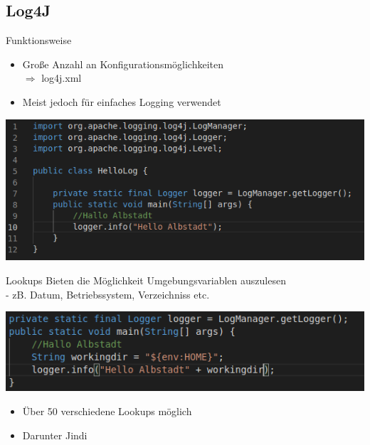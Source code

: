 \documentclass{beamer}
\begin{document}
\subsection{Log4J}
\begin{frame}{Funktionsweise}
\begin{itemize}
 \item Große Anzahl an Konfigurationsmöglichkeiten\\
$\Rightarrow$ log4j.xml
\item Meist jedoch für einfaches Logging verwendet
\end{itemize}
\begin{center}
\includegraphics[scale=0.45]{log4jexample.png}
\end{center}
\end{frame}
\begin{frame}
 \begin{block}{Lookups}
  Bieten die Möglichkeit Umgebungsvariablen auszulesen\\
  - zB. Datum, Betriebssystem, Verzeichniss etc.
 \end{block}
 \begin{center}
 \includegraphics[scale=0.45]{lookupsexample.png}
 \end{center}
 \begin{itemize}
  \item  Über 50 verschiedene Lookups möglich
  \item  Darunter Jindi
 \end{itemize}


 \end{frame}
\end{document}
